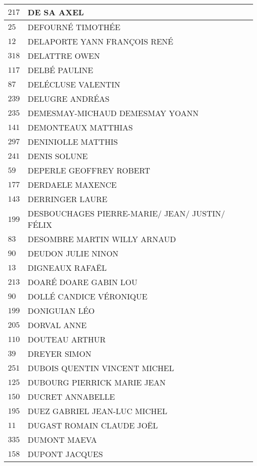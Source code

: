 \begin{xltabular}{\linewidth}{|l|X|}
    \hline
    $217$ & DE SA AXEL \\
    \hline
    $25$ & DEFOURNÉ TIMOTHÉE \\
    \hline
    $12$ & DELAPORTE YANN FRANÇOIS RENÉ \\
    \hline
    $318$ & DELATTRE OWEN \\
    \hline
    $117$ & DELBÉ PAULINE \\
    \hline
    $87$ & DELÉCLUSE VALENTIN \\
    \hline
    $239$ & DELUGRE ANDRÉAS \\
    \hline
    $235$ & DEMESMAY-MICHAUD DEMESMAY YOANN \\
    \hline
    $141$ & DEMONTEAUX MATTHIAS \\
    \hline
    $297$ & DENINIOLLE MATTHIS \\
    \hline
    $241$ & DENIS SOLUNE \\
    \hline
    $59$ & DEPERLE GEOFFREY ROBERT \\
    \hline
    $177$ & DERDAELE MAXENCE \\
    \hline
    $143$ & DERRINGER LAURE \\
    \hline
    $199$ & DESBOUCHAGES PIERRE-MARIE/ JEAN/ JUSTIN/ FÉLIX \\
    \hline
    $83$ & DESOMBRE MARTIN WILLY ARNAUD \\
    \hline
    $90$ & DEUDON JULIE NINON \\
    \hline
    $13$ & DIGNEAUX RAFAËL \\
    \hline
    $213$ & DOARÉ DOARE GABIN LOU \\
    \hline
    $90$ & DOLLÉ CANDICE VÉRONIQUE \\
    \hline
    $199$ & DONIGUIAN LÉO \\
    \hline
    $205$ & DORVAL ANNE \\
    \hline
    $110$ & DOUTEAU ARTHUR \\
    \hline
    $39$ & DREYER SIMON \\
    \hline
    $251$ & DUBOIS QUENTIN VINCENT MICHEL \\
    \hline
    $125$ & DUBOURG PIERRICK MARIE JEAN \\
    \hline
    $150$ & DUCRET ANNABELLE \\
    \hline
    $195$ & DUEZ GABRIEL JEAN-LUC MICHEL \\
    \hline
    $11$ & DUGAST ROMAIN CLAUDE JOËL \\
    \hline
    $335$ & DUMONT MAEVA \\
    \hline
    $158$ & DUPONT JACQUES \\

\end{xltabular}
